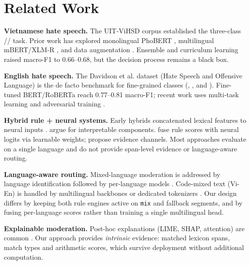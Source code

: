 \section{Related Work}
\label{sec:related_work}

\textbf{Vietnamese hate speech.}  The UIT-ViHSD corpus \cite{luu2021vihsd}
established the three-class \hate{}/\off{}/\clean{} task.  Prior work has
explored monolingual PhoBERT \cite{nguyen2020phobert}, multilingual mBERT/XLM-R
\cite{conneau2020xlmr}, and data augmentation \cite{nguyen2026vicm}.
Ensemble and curriculum learning \cite{bengio2009curriculum} raised macro-F1 to
0.66--0.68, but the decision process remains a black box.

\textbf{English hate speech.}  The Davidson et al. \cite{davidson2017automated}
dataset (Hate Speech and Offensive Language) is the de facto benchmark for
fine-grained classes (\hate{}, \off{}, and \clean{}).  Fine-tuned BERT/RoBERTa reach 0.77--0.81
macro-F1; recent work uses multi-task learning and adversarial training
\cite{macavaney2019hate}.

\textbf{Hybrid rule + neural systems.}  Early hybrids concatenated lexical
features to neural inputs \cite{waseem2016hateful}.  \cite{vidgen2021directions}
argue for interpretable components.  \cite{bojchevski2020fusing} fuse rule
scores with neural logits via learnable weights; \cite{ahn2022evidence}
propose evidence channels.  Most approaches evaluate on a single language and
do not provide span-level evidence or language-aware routing.

\textbf{Language-aware routing.}  Mixed-language moderation is addressed by
language identification \cite{lui2012langid} followed by per-language models
\cite{pires2019multilingual}.  Code-mixed text (Vi-En) is handled by
multilingual backbones or dedicated tokenizers \cite{nguyen2026vicm}.  Our
design differs by keeping both rule engines active on \texttt{mix} and
fallback segments, and by fusing per-language scores rather than training a
single multilingual head.

\textbf{Explainable moderation.}  Post-hoc explanations (LIME, SHAP,
attention) are common \cite{danilevsky2020survey}.  Our approach provides
\emph{intrinsic} evidence: matched lexicon spans, match types and arithmetic
scores, which survive deployment without additional computation.